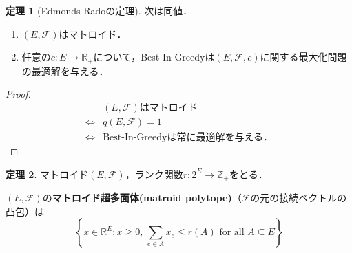 \documentclass[xelatex,ja=standard,a4paper,14pt,everyparhook=compat]{bxjsarticle}
\newcommand{\bbZ}{\mathbb{Z}}
\newcommand{\bbR}{\mathbb{R}}
\newcommand{\mcF}{\mathcal{F}}
\theoremstyle{definition}
\newtheorem{theorem}{定理}[section]
\begin{document}
\newpage

\begin{theorem}[Edmonds-Radoの定理]
    次は同値． \begin{enumerate}
        \item $(E,\mcF)$はマトロイド．
        \item 任意の$c:E\to\bbR_+$について，Best-In-Greedyは$(E,\mcF,c)$に関する最大化問題の最適解を与える．
    \end{enumerate}
\end{theorem}
\begin{proof}
    \begin{align*}
        & \text{$(E,\mcF)$はマトロイド} \\
        \Longleftrightarrow{}& q(E,\mcF) = 1 \\
        \Longleftrightarrow{}& \text{Best-In-Greedyは常に最適解を与える．}
    \end{align*}
\end{proof}

\begin{theorem}
    マトロイド$(E,\mcF)$，ランク関数$r:2^E \to \bbZ_+$をとる．

    $(E,\mcF)$の\textbf{マトロイド超多面体(matroid polytope)}（$\mcF$の元の接続ベクトルの凸包）は \begin{equation*}
        \left\{ x \in \bbR^E : \text{$x \geq 0$, $\sum_{e \in A} x_e \leq r(A)$ for all $A \subseteq E$} \right\}
    \end{equation*}
\end{theorem}
\end{document}
